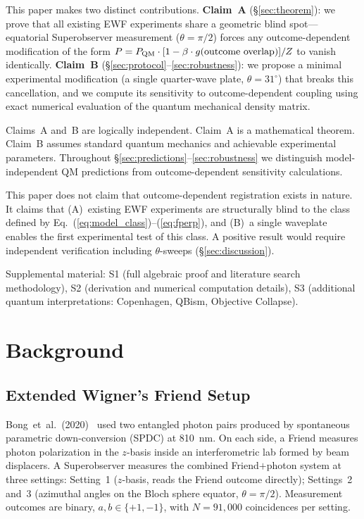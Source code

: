 \documentclass[twocolumn,aps,pra,superscriptaddress,floatfix,10pt]{revtex4-2}
\begin{document}
This paper makes two distinct contributions. \textbf{Claim~A}
(\S\ref{sec:theorem}): we prove that all existing EWF experiments share
a geometric blind spot---equatorial Superobserver measurement
($\theta = \pi/2$) forces any outcome-dependent modification of the form
$P = P_{\rm QM} \cdot [1 - \beta \cdot g(\text{outcome overlap})] / Z$
to vanish identically. \textbf{Claim~B} (\S\ref{sec:protocol}--\ref{sec:robustness}):
we propose a minimal experimental modification (a single quarter-wave
plate, $\theta = 31^\circ$) that breaks this cancellation, and we
compute its sensitivity to outcome-dependent coupling using exact
numerical evaluation of the quantum mechanical density matrix.

Claims~A and~B are logically independent. Claim~A is a mathematical
theorem. Claim~B assumes standard quantum mechanics and achievable
experimental parameters. Throughout \S\ref{sec:predictions}--\ref{sec:robustness}
we distinguish model-independent QM predictions from outcome-dependent
sensitivity calculations.

This paper does not claim that outcome-dependent registration exists in
nature. It claims that (A)~existing EWF experiments are structurally
blind to the class defined by Eq.~(\ref{eq:model_class})--(\ref{eq:fperp}),
and (B)~a single waveplate enables the first experimental test of this
class. A positive result would require independent verification including
$\theta$-sweeps (\S\ref{sec:discussion}).

Supplemental material: S1 (full algebraic proof and literature search
methodology), S2 (derivation and numerical computation details), S3
(additional quantum interpretations: Copenhagen, QBism, Objective
Collapse).

\section{Background}
\label{sec:background}

\subsection{Extended Wigner's Friend Setup}

Bong~et~al.~(2020)~\cite{Bong2020} used two entangled photon pairs
produced by spontaneous parametric down-conversion (SPDC) at 810~nm. On
each side, a Friend measures photon polarization in the $z$-basis inside
an interferometric lab formed by beam displacers. A Superobserver
measures the combined Friend$+$photon system at three settings:
Setting~1 ($z$-basis, reads the Friend outcome directly); Settings~2
and~3 (azimuthal angles on the Bloch sphere equator, $\theta = \pi/2$).
Measurement outcomes are binary, $a,b \in \{+1,-1\}$, with
$N = 91{,}000$ coincidences per setting.
\end{document}
